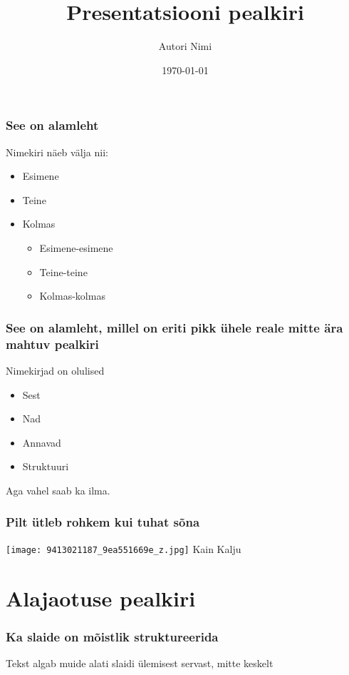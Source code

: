 \documentclass{beamer}
\title{Presentatsiooni pealkiri}
\date{\today}
\author{Autori Nimi}
\institute{Asutus ja tiitel}
\begin{document}
\begin{frame}
\titlepage
\end{frame}

\begin{frame}[t]
	\frametitle{See on alamleht}
	Nimekiri näeb välja nii:
	\begin{itemize}
		\item Esimene
		\item Teine
		\item Kolmas
		\begin{itemize}
			\item Esimene-esimene
			\item Teine-teine
			\item Kolmas-kolmas
		\end{itemize}
	\end{itemize}
\end{frame}

\begin{frame}[t]
	\frametitle{See on alamleht, millel on eriti pikk ühele reale mitte ära mahtuv pealkiri}
	Nimekirjad on olulised
	\begin{itemize}
		\item Sest
		\item Nad 
		\item Annavad 
		\item Struktuuri
	\end{itemize}
	Aga vahel saab ka ilma.
\end{frame}

\begin{frame}
	\frametitle{Pilt ütleb rohkem kui tuhat sõna}
	\texttt{[image: 9413021187\_9ea551669e\_z.jpg]}
	\vskip-1mm
	{\tiny Kain Kalju}
\end{frame}

\section{Alajaotuse pealkiri}

\begin{frame}[t]
	\frametitle{Ka slaide on mõistlik struktureerida}
	Tekst algab muide alati slaidi ülemisest servast, mitte keskelt
\end{frame}

\plain
\end{document}
